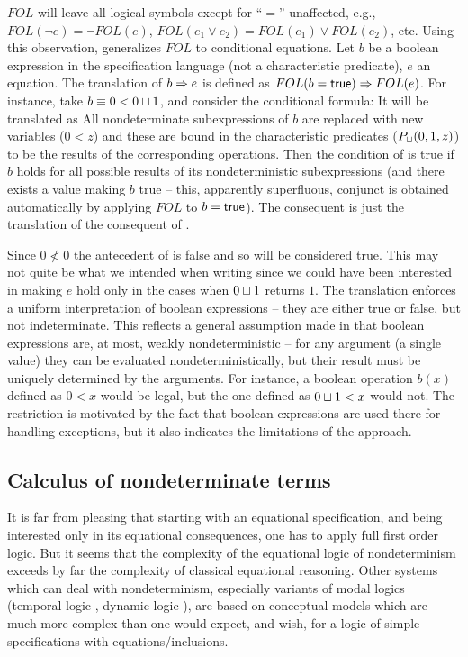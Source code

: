 {$FOL$ will leave all logical symbols except for ``$=$'' unaffected,
e.g., $FOL(\neg e) = \neg FOL(e)$, $FOL(e_{1}\lor e_{2}) =
FOL(e_{1})\lor FOL(e_{2})$, etc. Using this observation, \cite{c:64}
generalizes $FOL$ to conditional equations.  Let $b$ be a boolean
expression in the specification language (not a characteristic
predicate), $e$ an equation. The translation of $b\mathrel{\Rightarrow} e$ is defined
as $FOL(b={\sf true})\mathrel{\Rightarrow} FOL(e)$.  For instance, take $b\mathrel{\equiv} 0 < 0\sqcup
1$, and consider the conditional formula:
It will be translated as
All nondeterminate subexpressions of $b$ are replaced with new 
variables ($0<z$) and these are bound in the 
characteristic predicates ($P_{\sqcup}(0,1,z)$) to be the results of the corresponding operations. Then the condition of 
\refp{eq:bb} is true if $b$ holds for all possible results of its nondeterministic subexpressions (and there exists a value 
making $b$ true -- this, apparently superfluous, conjunct is obtained automatically 
by applying $FOL$ to $b={\sf true}$). 
The consequent is just the translation of the consequent of 
.
 
Since $0\not< 0$ the antecedent of  is false and so 
 will be considered true. This may not quite be
what we intended when writing \refp{eq:b} since we could have been
interested in making $e$ hold only in the cases when $0\sqcup 1$ returns
$1$. The translation enforces a uniform interpretation of boolean
expressions -- they are either true or false, but not
indeterminate. This reflects a general assumption made in \cite{c:64}
that boolean expressions are, at most, weakly nondeterministic -- for
any argument (a single value) they can be evaluated
nondeterministically, but their result must be uniquely determined by
the arguments. For instance, a boolean operation $b(x)$ defined as
$0<x$ would be legal, but the one defined as $0\sqcup 1<x$ would not.
The restriction is motivated by the fact that boolean expressions are
used there for handling exceptions, but it also indicates the
limitations of the approach.

\subsection{Calculus of nondeterminate terms}\label{sub:nondet} 
It is far from pleasing that starting with an equational specification, and being interested only in its 
equational consequences, one has to apply full first order logic. But it seems that the complexity of the 
equational logic of nondeterminism exceeds by far the complexity of classical equational reasoning. 
Other systems which can deal with nondeterminism, especially variants of modal logics (temporal logic 
\cite{c:83, c:10, c:71}, dynamic logic \cite{c:47, c:36, c:46}),  are based on conceptual models which are much more complex 
than one would expect, and wish, for a logic of simple specifications with equations/inclusions.  

}
